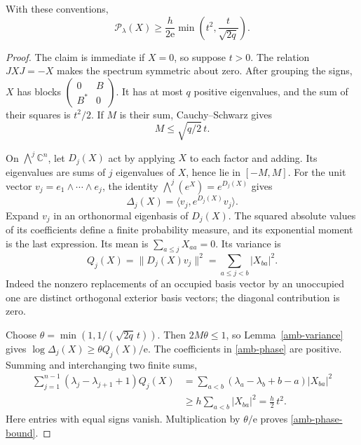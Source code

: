 \begin{proposition}\label{amb-principal-minor-bound}
With these conventions,
\begin{equation}\label{amb-phase-bound}
 \mathcal P_\lambda(X)\ge
       \frac{h}{2\mathrm e}
                \min\left(t^2,\frac{t}{\sqrt{2q}}\right).
\end{equation}
\end{proposition}
\begin{proof}
The claim is immediate if $X=0$, so suppose $t>0$.
The relation $JXJ=-X$ makes the spectrum symmetric about zero.
After grouping the signs, $X$ has blocks
$\left(\begin{smallmatrix}0&B\\B^*&0\end{smallmatrix}\right)$.
It has at most $q$ positive eigenvalues, and the sum of their
squares is $t^2/2$. If $M$ is their sum, Cauchy--Schwarz gives
\[
                          M\le\sqrt{q/2}\,t.
\]

On $\bigwedge^j\mathbb C^n$, let $D_j(X)$ act by applying
$X$ to each factor and adding. Its eigenvalues are sums of
$j$ eigenvalues of $X$, hence lie in $[-M,M]$.
For the unit vector $v_j=e_1\wedge\cdots\wedge e_j$,
the identity $\bigwedge^j(e^X)=e^{D_j(X)}$ gives
\[
 \Delta_j(X)=\langle v_j,e^{D_j(X)}v_j\rangle.
\]
Expand $v_j$ in an orthonormal eigenbasis of $D_j(X)$.
The squared absolute values of its coefficients define a
finite probability measure, and its exponential moment is
the last expression. Its mean is
$\sum_{a\le j}X_{aa}=0$. Its variance is
\[
 Q_j(X)=\|D_j(X)v_j\|^2
                  =\sum_{a\le j<b}|X_{ba}|^2.
\]
Indeed the nonzero replacements of an occupied basis vector
by an unoccupied one are distinct orthogonal exterior basis
vectors; the diagonal contribution is zero.

Choose
$\theta=\min(1,1/(\sqrt{2q}\,t))$.
Then $2M\theta\le1$, so Lemma~\ref{amb-variance} gives
$\log\Delta_j(X)\ge\theta Q_j(X)/\mathrm e$.
The coefficients in \eqref{amb-phase} are positive. Summing
and interchanging two finite sums,
\[
 \begin{split}
 \sum_{j=1}^{n-1}(\lambda_j-\lambda_{j+1}+1)Q_j(X)
  &=\sum_{a<b}(\lambda_a-\lambda_b+b-a)|X_{ba}|^2\\
  &\ge h\sum_{a<b}|X_{ba}|^2
   =\frac h2\,t^2.
 \end{split}
\]
Here entries with equal signs vanish. Multiplication by
$\theta/\mathrm e$ proves \eqref{amb-phase-bound}.
\end{proof}

